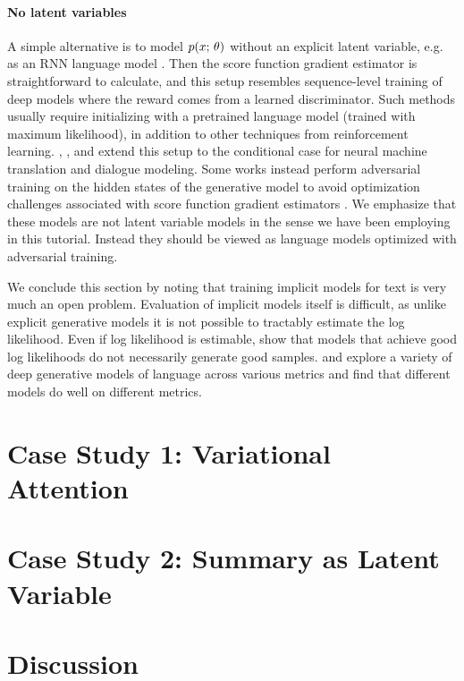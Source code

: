 \documentclass{article}
\begin{document}
\paragraph{No latent variables} A simple alternative is to model $p(x ; \, \theta)$
without an explicit latent variable, e.g. as an RNN language model \citep{Yu2017,lin2017adversarial,guo2018leakgan}. Then the
score function gradient estimator is straightforward to calculate, and this setup
resembles sequence-level training of deep models \citep{ranzato2016seq} where the reward comes from a learned
discriminator. Such methods usually require initializing with a pretrained  language model (trained with maximum likelihood), in addition
to other techniques from reinforcement learning.
\cite{Li2017}, \cite{wu2017adnmt}, and \cite{yang2018nmtgan} extend this setup to the conditional case for neural machine translation and dialogue modeling. Some works instead perform 
adversarial training on the hidden states of the generative model to avoid optimization challenges associated with score function gradient estimators \citep{lamb2016,Shen2017,xu2017embgan}.
We emphasize that these models
are not latent variable models in the sense we have been employing in this tutorial. Instead they should be viewed as language models optimized with adversarial training.

We conclude this section by noting that training implicit models for text is very much an open problem. Evaluation of implicit models itself is difficult, as unlike explicit generative models it is not possible to tractably estimate the log likelihood. Even if log likelihood is estimable, \cite{Theis2016} show that 
models that achieve good log likelihoods do not necessarily generate good samples.
\cite{cifka2018} and \cite{sem2018ganeval} explore a variety of deep generative models of language across various metrics and find that different models do well on different metrics.


\section{Case Study 1: Variational Attention}
\section{Case Study 2: Summary as Latent Variable}

\section{Discussion}
\small


\end{document}
